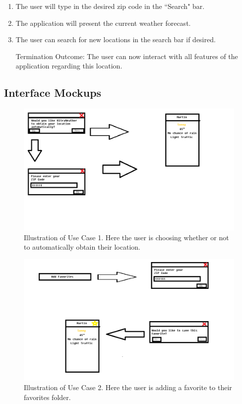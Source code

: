 \documentclass[10pt,conference,onecolumn,compsoc]{IEEEtran}
\begin{document}
\begin{enumerate}
\item The user will type in the desired zip code in the ``Search" bar.
\item The application will present the current weather forecast.
\item The user can search for new locations in the search bar if desired. 
\item[Termination Outcome:] The user can now interact with all features of the application regarding this location.
\end{enumerate}

\subsection{Interface Mockups}
\begin{figure}[ht!]
\includegraphics[scale=0.3]{use_case_1.png}
\caption{Illustration of Use Case 1. Here the user is choosing whether or not to automatically obtain their location.}
\label{use_case_1}
\end{figure}

\begin{figure}[ht!]
\includegraphics[scale=0.3]{use_case_2.png}
\caption{Illustration of Use Case 2. Here the user is adding a favorite to their favorites folder.}
\label{use_case_2}
\end{figure}
\end{document}
